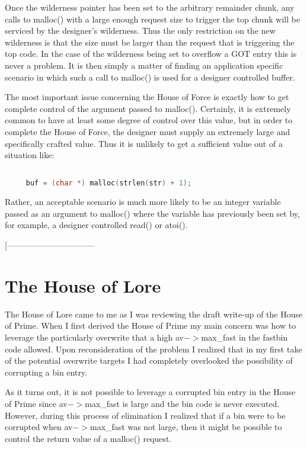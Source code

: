 \documentclass[12pt]{article}
\begin{document}
Once the wilderness pointer has been set to the arbitrary remainder
chunk, any calls to malloc() with a large enough request size to
trigger the top chunk will be serviced by the designer's
wilderness. Thus the only restriction on the new wilderness is that
the size must be larger than the request that is triggering the top
code. In the case of the wilderness being set to overflow a GOT
entry this is never a problem. It is then simply a matter of
finding an application specific scenario in which such a call to
malloc() is used for a designer controlled buffer.
\newline


The most important issue concerning the House of Force is exactly
how to get complete control of the argument passed to malloc().
Certainly, it is extremely common to have at least some degree of
control over this value, but in order to complete the House of
Force, the designer must supply an extremely large and specifically
crafted value. Thus it is unlikely to get a sufficient value out of
a situation like:
\begin{lstlisting}[language=C]

     buf = (char *) malloc(strlen(str) + 1);
\end{lstlisting}
Rather, an acceptable scenario is much more likely to be an integer
variable passed as an argument to malloc() where the variable has
previously been set by, for example, a designer controlled read()
or atoi().
\newline


[--------------------------------

\section{The House of Lore}

The House of Lore came to me as I was reviewing the draft write-up
of the House of Prime. When I first derived the House of Prime my
main concern was how to leverage the particularly overwrite that a
high av$->$max\_fast in the fastbin code allowed. Upon reconsideration
of the problem I realized that in my first take of the potential
overwrite targets I had completely overlooked the possibility of
corrupting a bin entry.
\newline


As it turns out, it is not possible to leverage a corrupted bin
entry in the House of Prime since av$->$max\_fast is large and the bin
code is never executed. However, during this process of elimination
I realized that if a bin were to be corrupted when av$->$max\_fast was
not large, then it might be possible to control the return value of
a malloc() request.
\newline
\end{document}
